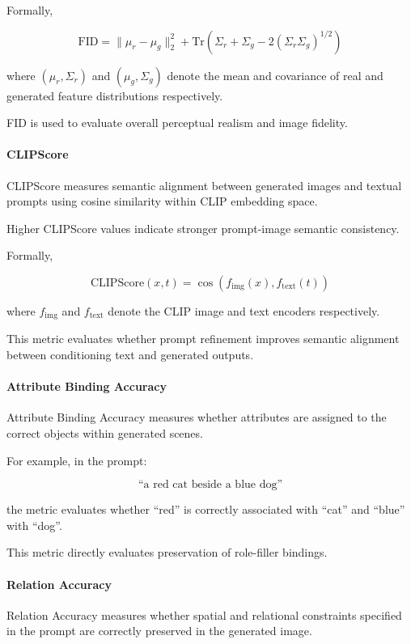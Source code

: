 \documentclass[a4paper,twoside,12pt]{report}
\begin{document}
Formally,

\[
\mathrm{FID}
=
\|\mu_r - \mu_g\|_2^2
+
\mathrm{Tr}
\left(
\Sigma_r + \Sigma_g
-
2(\Sigma_r \Sigma_g)^{1/2}
\right)
\]

where \((\mu_r, \Sigma_r)\) and \((\mu_g, \Sigma_g)\) denote the mean and covariance of real and generated feature distributions respectively.

FID is used to evaluate overall perceptual realism and image fidelity.

\paragraph{CLIPScore}

CLIPScore measures semantic alignment between generated images and textual prompts using cosine similarity within CLIP embedding space.

Higher CLIPScore values indicate stronger prompt-image semantic consistency.

Formally,

\[
\mathrm{CLIPScore}(x,t)
=
\cos
\left(
f_{\mathrm{img}}(x),
f_{\mathrm{text}}(t)
\right)
\]

where \(f_{\mathrm{img}}\) and \(f_{\mathrm{text}}\) denote the CLIP image and text encoders respectively.

This metric evaluates whether prompt refinement improves semantic alignment between conditioning text and generated outputs.

\paragraph{Attribute Binding Accuracy}

Attribute Binding Accuracy measures whether attributes are assigned to the correct objects within generated scenes.

For example, in the prompt:

\[
\text{``a red cat beside a blue dog''}
\]

the metric evaluates whether ``red'' is correctly associated with ``cat'' and ``blue'' with ``dog''.

This metric directly evaluates preservation of role-filler bindings.

\paragraph{Relation Accuracy}

Relation Accuracy measures whether spatial and relational constraints specified in the prompt are correctly preserved in the generated image.
\end{document}
